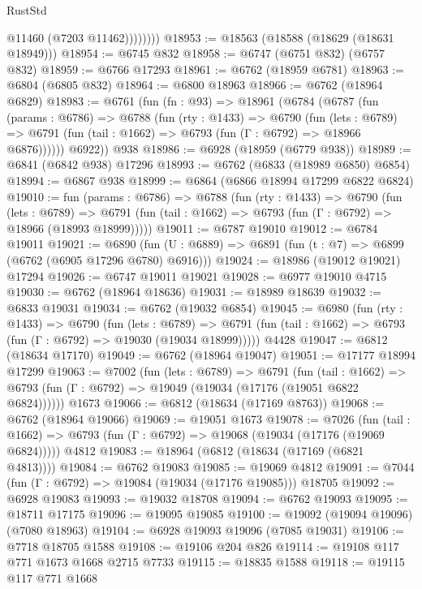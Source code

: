 \begin{lexlean}{RustStd}
\begin{coremodule}
                  @11460
                  (@7203 @11462))))))))
@18953 := @18563 (@18588 (@18629 (@18631 @18949)))
@18954 := @6745 @832
@18958 := @6747 (@6751 @832) (@6757 @832)
@18959 := @6766 @17293
@18961 := @6762 (@18959 @6781)
@18963 := @6804 (@6805 @832)
@18964 := @6800 @18963
@18966 := @6762 (@18964 @6829)
@18983 := @6761
    (fun (fn : @93) =>
    @18961
      (@6784
        (@6787
          (fun (params : @6786) =>
          @6788
            (fun (rty : @1433) =>
            @6790
              (fun (lets : @6789) =>
              @6791 (fun (tail : @1662) => @6793 (fun (Γ : @6792) => @18966 @6876))))))
        @6922))
    @938
@18986 := @6928 (@18959 (@6779 @938))
@18989 := @6841 (@6842 @938) @17296
@18993 := @6762 (@6833 (@18989 @6850) @6854)
@18994 := @6867 @938
@18999 := @6864 (@6866 @18994 @17299 @6822 @6824)
@19010 := fun (params : @6786) =>
  @6788
    (fun (rty : @1433) =>
    @6790
      (fun (lets : @6789) =>
      @6791 (fun (tail : @1662) => @6793 (fun (Γ : @6792) => @18966 (@18993 @18999)))))
@19011 := @6787 @19010
@19012 := @6784 @19011
@19021 := @6890
    (fun (U : @6889) => @6891 (fun (t : @7) => @6899 (@6762 (@6905 @17296 @6780) @6916)))
@19024 := @18986 (@19012 @19021) @17294
@19026 := @6747 @19011 @19021
@19028 := @6977 @19010 @4715
@19030 := @6762 (@18964 @18636)
@19031 := @18989 @18639
@19032 := @6833 @19031
@19034 := @6762 (@19032 @6854)
@19045 := @6980
    (fun (rty : @1433) =>
    @6790
      (fun (lets : @6789) =>
      @6791 (fun (tail : @1662) => @6793 (fun (Γ : @6792) => @19030 (@19034 @18999)))))
    @4428
@19047 := @6812 (@18634 @17170)
@19049 := @6762 (@18964 @19047)
@19051 := @17177 @18994 @17299
@19063 := @7002
    (fun (lets : @6789) =>
    @6791
      (fun (tail : @1662) =>
      @6793 (fun (Γ : @6792) => @19049 (@19034 (@17176 (@19051 @6822 @6824))))))
    @1673
@19066 := @6812 (@18634 (@17169 @8763))
@19068 := @6762 (@18964 @19066)
@19069 := @19051 @1673
@19078 := @7026
    (fun (tail : @1662) => @6793 (fun (Γ : @6792) => @19068 (@19034 (@17176 (@19069 @6824)))))
    @4812
@19083 := @18964 (@6812 (@18634 (@17169 (@6821 @4813))))
@19084 := @6762 @19083
@19085 := @19069 @4812
@19091 := @7044 (fun (Γ : @6792) => @19084 (@19034 (@17176 @19085))) @18705
@19092 := @6928 @19083
@19093 := @19032 @18708
@19094 := @6762 @19093
@19095 := @18711 @17175
@19096 := @19095 @19085
@19100 := @19092 (@19094 @19096) (@7080 @18963)
@19104 := @6928 @19093 @19096 (@7085 @19031)
@19106 := @7718 @18705 @1588
@19108 := @19106 @204 @826
@19114 := @19108 @117 @771 @1673 @1668 @2715 @7733
@19115 := @18835 @1588
@19118 := @19115 @117 @771 @1668

\end{coremodule}
\end{lexlean}
